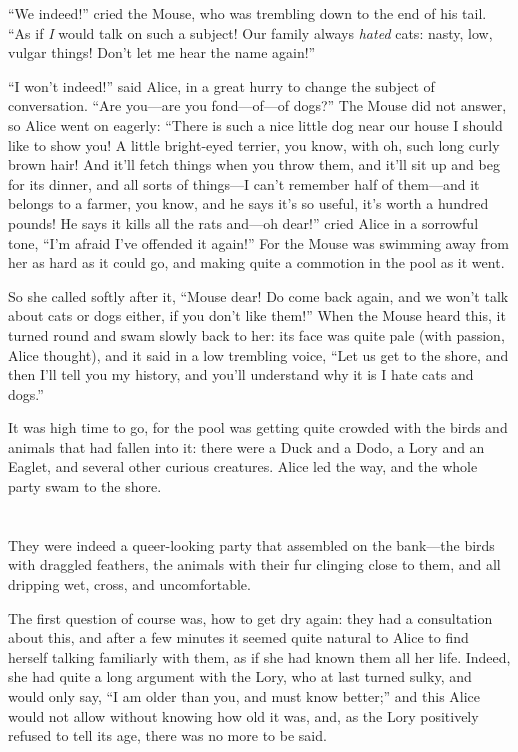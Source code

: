 \documentclass[book, 20pt]{extbook}
\begin{document}
``We indeed!'' cried the Mouse, who was trembling down to the end of his
tail. ``As if \emph{I} would talk on such a subject! Our family always
\emph{hated} cats: nasty, low, vulgar things! Don't let me hear the name
again!''

``I won't indeed!'' said Alice, in a great hurry to change the subject
of conversation. ``Are you---are you fond---of---of dogs?'' The Mouse
did not answer, so Alice went on eagerly: ``There is such a nice little
dog near our house I should like to show you! A little bright-eyed
terrier, you know, with oh, such long curly brown hair! And it'll fetch
things when you throw them, and it'll sit up and beg for its dinner, and
all sorts of things---I can't remember half of them---and it belongs to
a farmer, you know, and he says it's so useful, it's worth a hundred
pounds! He says it kills all the rats and---oh dear!'' cried Alice in a
sorrowful tone, ``I'm afraid I've offended it again!'' For the Mouse was
swimming away from her as hard as it could go, and making quite a
commotion in the pool as it went.

So she called softly after it, ``Mouse dear! Do come back again, and we
won't talk about cats or dogs either, if you don't like them!'' When the
Mouse heard this, it turned round and swam slowly back to her: its face
was quite pale (with passion, Alice thought), and it said in a low
trembling voice, ``Let us get to the shore, and then I'll tell you my
history, and you'll understand why it is I hate cats and dogs.''

It was high time to go, for the pool was getting quite crowded with the
birds and animals that had fallen into it: there were a Duck and a Dodo,
a Lory and an Eaglet, and several other curious creatures. Alice led the
way, and the whole party swam to the shore.

\chapter*{}

They were indeed a queer-looking party that assembled on the bank---the
birds with draggled feathers, the animals with their fur clinging close
to them, and all dripping wet, cross, and uncomfortable.

The first question of course was, how to get dry again: they had a
consultation about this, and after a few minutes it seemed quite natural
to Alice to find herself talking familiarly with them, as if she had
known them all her life. Indeed, she had quite a long argument with the
Lory, who at last turned sulky, and would only say, ``I am older than
you, and must know better;'' and this Alice would not allow without
knowing how old it was, and, as the Lory positively refused to tell its
age, there was no more to be said.
\end{document}
